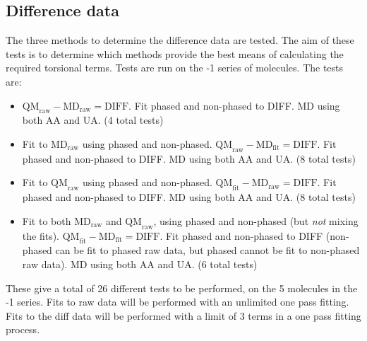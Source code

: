 \documentclass[11pt, oneside, draft]{article}   	%
\begin{document}
\subsection{Difference data}
The three methods to determine the difference data are tested. The aim of these tests is to determine which methods provide the best means of calculating the required torsional terms. Tests are run on the -1 series of molecules. The tests are:
\begin{itemize}
\item $\text{QM}_{\text{raw}} - \text{MD}_{\text{raw}} = \text{DIFF}$. Fit phased and non-phased to DIFF. MD using both AA and UA. (4 total tests)
\item Fit to $\text{MD}_{\text{raw}}$ using phased and non-phased. $\text{QM}_{\text{raw}} - \text{MD}_{\text{fit}} = \text{DIFF}$. Fit phased and non-phased to DIFF. MD using both AA and UA. (8 total tests)
\item Fit to $\text{QM}_{\text{raw}}$ using phased and non-phased. $\text{QM}_{\text{fit}} - \text{MD}_{\text{raw}} = \text{DIFF}$. Fit phased and non-phased to DIFF. MD using both AA and UA. (8 total tests)
\item Fit to both $\text{MD}_{\text{raw}}$ and $\text{QM}_{\text{raw}}$, using phased and non-phased (but \emph{not} mixing the fits). $\text{QM}_{\text{fit}} - \text{MD}_{\text{fit}} = \text{DIFF}$. Fit phased and non-phased to DIFF (non-phased can be fit to phased raw data, but phased cannot be fit to non-phased raw data). MD using both AA and UA. (6 total tests)
\end{itemize}
These give a total of 26 different tests to be performed, on the 5 molecules in the -1 series. Fits to raw data will be performed with an unlimited one pass fitting. Fits to the diff data will be performed with a limit of 3 terms in a one pass fitting process.
\end{document}
